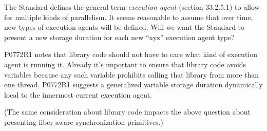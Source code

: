 The Standard defines the general term \emph{execution agent} (section
33.2.5.1) to allow for multiple kinds of parallelism. It seems reasonable to
assume that over time, new types of execution agents will be defined. Will we
want the Standard to present a new  storage duration for each
new ``xyz'' execution agent type?

P0772R1\cite{P0772R1} notes that library code should not have to care what
kind of execution agent is running it. Already it's important to ensure that
library code avoids  variables because any such variable prohibits
calling that library from more than one thread. P0772R1 suggests a generalized
variable storage duration dynamically local to the innermost current execution
agent.

(The same consideration about library code impacts the above question about
presenting fiber-aware synchronization primitives.)
\newpage

